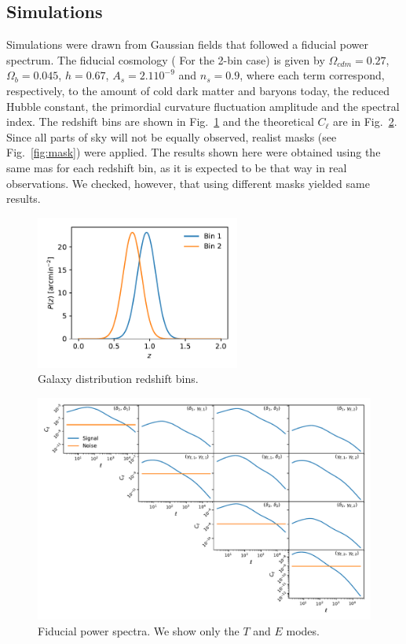 \documentclass[a4paper,11pt]{article}
\newcommand{\cl}{C_\ell}
\newcommand{\red}[1]{{\color{red} #1}}
\begin{document}
\subsection{Simulations}

Simulations were drawn from Gaussian fields that followed a fiducial power
spectrum. The fiducial cosmology (\red{For the 2-bin case}) is given by
$\Omega_{cdm} = 0.27$, $\Omega_b = 0.045$, $h = 0.67$, $A_s = 2.1 10^{-9}$ and
$n_s = 0.9$, where each term correspond, respectively, to the amount of cold
dark matter and baryons today, the reduced Hubble constant, the primordial
curvature fluctuation amplitude and the spectral index. The redshift bins are
shown in Fig.~\ref{fig:pz} and the theoretical $\cl$ are in
Fig.~\ref{fig:cl-2bins}. Since all parts of sky will not be equally observed,
realist masks (see Fig.~\ref{fig:mask}) were applied.  The results shown here
were obtained using the same mas for each redshift bin, as it is expected to
be that way in real observations. We checked, however, that using different
masks yielded same results. 

\begin{figure}
  \centering
  \includegraphics[width=0.6\textwidth]{./figures/pz.pdf}
  \caption{Galaxy distribution redshift bins.}
  \label{fig:pz}
\end{figure}

\begin{figure}
  \centering
  \includegraphics[width=\textwidth]{./figures/cls-sph-2b.pdf}
  \caption{Fiducial power spectra. We show only the $T$ and $E$ modes.}
  \label{fig:cl-2bins}
\end{figure}
\end{document}
